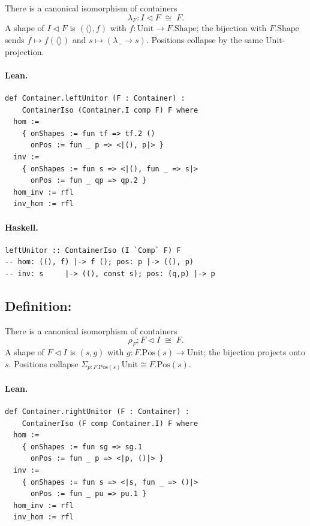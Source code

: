 \documentclass[11pt,a4paper]{article}
\begin{document}
\begin{defn}
There is a canonical isomorphism of containers
\[
  \lambda_F : I \triangleleft F \;\cong\; F.
\]
A shape of $I \triangleleft F$ is $(\langle\rangle, f)$ with
$f : \mathrm{Unit} \to F.\mathrm{Shape}$; the bijection with $F.\mathrm{Shape}$
sends $f \mapsto f(\langle\rangle)$ and $s \mapsto (\lambda\, \_ \to s)$.
Positions collapse by the same $\mathrm{Unit}$-projection.
\end{defn}

\paragraph{Lean.}
\begin{lstlisting}[style=lean]
def Container.leftUnitor (F : Container) :
    ContainerIso (Container.I comp F) F where
  hom :=
    { onShapes := fun tf => tf.2 ()
      onPos := fun _ p => <|(), p|> }
  inv :=
    { onShapes := fun s => <|(), fun _ => s|>
      onPos := fun _ qp => qp.2 }
  hom_inv := rfl
  inv_hom := rfl
\end{lstlisting}

\paragraph{Haskell.}
\begin{lstlisting}[style=haskell]
leftUnitor :: ContainerIso (I `Comp` F) F
-- hom: ((), f) |-> f (); pos: p |-> ((), p)
-- inv: s     |-> ((), const s); pos: (q,p) |-> p
\end{lstlisting}


\subsection{Definition: }

\begin{defn}
There is a canonical isomorphism of containers
\[
  \rho_F : F \triangleleft I \;\cong\; F.
\]
A shape of $F \triangleleft I$ is $(s, g)$ with $g : F.\mathrm{Pos}(s) \to
\mathrm{Unit}$; the bijection projects onto $s$.  Positions collapse
$\Sigma_{p : F.\mathrm{Pos}(s)} \mathrm{Unit} \cong F.\mathrm{Pos}(s)$.
\end{defn}

\paragraph{Lean.}
\begin{lstlisting}[style=lean]
def Container.rightUnitor (F : Container) :
    ContainerIso (F comp Container.I) F where
  hom :=
    { onShapes := fun sg => sg.1
      onPos := fun _ p => <|p, ()|> }
  inv :=
    { onShapes := fun s => <|s, fun _ => ()|>
      onPos := fun _ pu => pu.1 }
  hom_inv := rfl
  inv_hom := rfl
\end{lstlisting}
\end{document}
